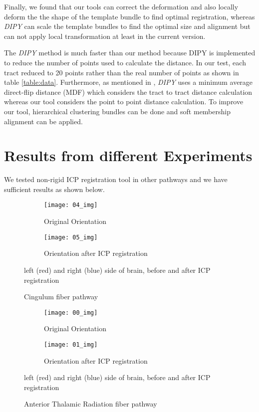 \documentclass[../structure.tex]{subfiles}
\begin{document}
Finally, we found that our tools can correct the deformation and also locally deform the the shape of the template bundle to find optimal registration, whereas \textit{DIPY} can scale the template bundles to find the optimal size and alignment but can not apply local transformation at least in the current version.

The \textit{DIPY} method is much faster than our method because DIPY is implemented to reduce the number of points used to calculate the distance. In our test, each tract reduced to 20 points rather than the real number of points as shown in table \ref{table:data}. Furthermore, as mentioned in \cite{Garyfallidis2012}, \textit{DIPY} uses a minimum average direct-flip distance (MDF) which considers the tract to tract distance calculation whereas our tool considers the point to point distance calculation. To improve our tool, hierarchical clustering bundles can be done and soft membership alignment can be applied.

\section{Results from different Experiments}
We tested non-rigid ICP registration tool in other pathways and we have sufficient results as shown below.

\begin{figure}[H]
	\centering
	\begin{subfigure}[b]{0.49\textwidth}
	\centering
	\texttt{[image: 04\_img]}
	\caption{Original Orientation}
	\end{subfigure}
	\begin{subfigure}[b]{0.49\textwidth}
	\centering
	\texttt{[image: 05\_img]}
	\caption{Orientation after ICP registration}
	\end{subfigure}
\captionsetup{justification=centering}
\caption{Cingulum fiber pathway}
{left (red) and right (blue) side of brain, before and after ICP registration}
\label{fig:pca}
\end{figure}

\begin{figure}[H]
	\centering
	\begin{subfigure}[b]{0.49\textwidth}
	\centering
	\texttt{[image: 00\_img]}
	\caption{Original Orientation}
	\end{subfigure}
	\begin{subfigure}[b]{0.49\textwidth}
	\centering
	\texttt{[image: 01\_img]}
	\caption{Orientation after ICP registration}
	\end{subfigure}
\captionsetup{justification=centering}
\caption{Anterior Thalamic Radiation fiber pathway}{ left (red) and right (blue) side of brain, before and after ICP registration}
\label{fig:pca}
\end{figure}
\end{document}
